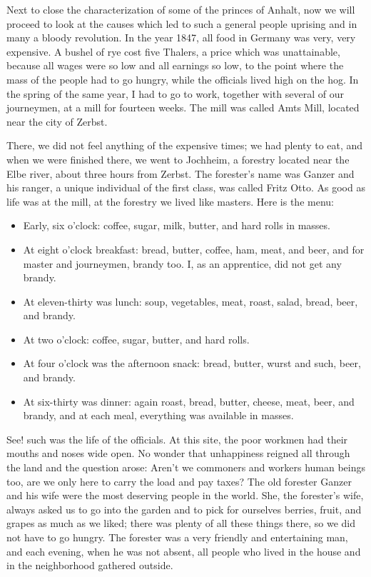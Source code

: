 \documentclass{article}
\providecommand{\tightlist}{%
  \setlength{\itemsep}{0pt}\setlength{\parskip}{0pt}}
\begin{document}
Next to close the characterization of some of the princes of Anhalt, now we will proceed to look at the causes which led to such a general people uprising and in many a bloody revolution. In the year 1847, all food in Germany was very, very expensive. A bushel of rye cost five Thalers, a price which was unattainable, because all wages were so low and all earnings so low, to the point where the mass of the people had to go hungry, while the officials lived high on the hog. In the spring of the same year, I had to go to work, together with several of our journeymen, at a mill for fourteen weeks. The mill was called Amts Mill, located near the city of Zerbst.

There, we did not feel anything of the expensive times; we had plenty to eat, and when we were finished there, we went to Jochheim, a forestry located near the Elbe river, about three hours from Zerbst. The forester's name was Ganzer and his ranger, a unique individual of the first class, was called Fritz Otto. As good as life was at the mill, at the forestry we lived like masters. Here is the menu:

\begin{itemize}
\tightlist
\item
  Early, six o'clock: coffee, sugar, milk, butter, and hard rolls in masses.
\item
  At eight o'clock breakfast: bread, butter, coffee, ham, meat, and beer, and for master and journeymen, brandy too. I, as an apprentice, did not get any brandy.
\item
  At eleven-thirty was lunch: soup, vegetables, meat, roast, salad, bread, beer, and brandy.
\item
  At two o'clock: coffee, sugar, butter, and hard rolls.
\item
  At four o'clock was the afternoon snack: bread, butter, wurst and such, beer, and brandy.
\item
  At six-thirty was dinner: again roast, bread, butter, cheese, meat, beer, and brandy, and at each meal, everything was available in masses.
\end{itemize}

See! such was the life of the officials. At this site, the poor workmen had their mouths and noses wide open. No wonder that unhappiness reigned all through the land and the question arose: Aren't we commoners and workers human beings too, are we only here to carry the load and pay taxes? The old forester Ganzer and his wife were the most deserving people in the world. She, the forester's wife, always asked us to go into the garden and to pick for ourselves berries, fruit, and grapes as much as we liked; there was plenty of all these things there, so we did not have to go hungry. The forester was a very friendly and entertaining man, and each evening, when he was not absent, all people who lived in the house and in the neighborhood gathered outside.
\end{document}
